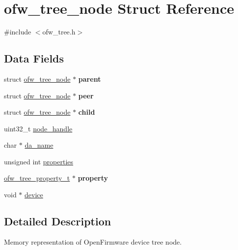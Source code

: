 \hypertarget{structofw__tree__node}{}\section{ofw\+\_\+tree\+\_\+node Struct Reference}
\label{structofw__tree__node}


{\ttfamily \#include $<$ofw\+\_\+tree.\+h$>$}

\subsection*{Data Fields}
\begin{DoxyCompactItemize}
\item 
\mbox{\label{structofw__tree__node_a8f4283b589c709c5134b09ecd787a4f4}} 
struct \mbox{\hyperlink{structofw__tree__node}{ofw\+\_\+tree\+\_\+node}} $\ast$ {\bfseries parent}
\item 
\mbox{\label{structofw__tree__node_a3d346b0076b1b272fb75059ace5f7072}} 
struct \mbox{\hyperlink{structofw__tree__node}{ofw\+\_\+tree\+\_\+node}} $\ast$ {\bfseries peer}
\item 
\mbox{\label{structofw__tree__node_a7f97b7f4d838523c9e6ad5cf2447fe1d}} 
struct \mbox{\hyperlink{structofw__tree__node}{ofw\+\_\+tree\+\_\+node}} $\ast$ {\bfseries child}
\item 
uint32\+\_\+t \mbox{\hyperlink{structofw__tree__node_a391eaf3e7335a6329ca81fcd77c050be}{node\+\_\+handle}}
\item 
char $\ast$ \mbox{\hyperlink{structofw__tree__node_a73668a73c5c382a7fb0b35ecdeae0c36}{da\+\_\+name}}
\item 
unsigned int \mbox{\hyperlink{structofw__tree__node_aa508923747451d53edb621f6660b4e68}{properties}}
\item 
\mbox{\label{structofw__tree__node_aa346a1c184cc8aca5d89eea2119c7fb4}} 
\mbox{\hyperlink{structofw__tree__property__t}{ofw\+\_\+tree\+\_\+property\+\_\+t}} $\ast$ {\bfseries property}
\item 
void $\ast$ \mbox{\hyperlink{structofw__tree__node_ac3e2890623aeb074f9391d4a4677e44e}{device}}
\end{DoxyCompactItemize}


\subsection{Detailed Description}
Memory representation of Open\+Firmware device tree node. 

